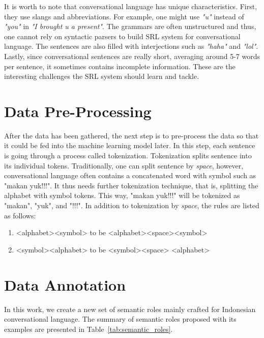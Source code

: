 It is worth to note that conversational language has unique characteristics. First, they use slangs and abbreviations. For example, one might use \textit{"u"} instead of \textit{"you"} in \textit{"I brought u a present"}. The grammars are often unstructured and thus, one cannot rely on syntactic parsers to build SRL system for conversational language. The sentences are also filled with interjections such as \textit{"haha"} and \textit{"lol"}. Lastly, since conversational sentences are really short, averaging around 5-7 words per sentence, it sometimes contains incomplete information. These are the interesting challenges the SRL system should learn and tackle.

\section{Data Pre-Processing}
After the data has been gathered, the next step is to pre-process the data so that it could be fed into the machine learning model later. In this step, each sentence is going through a process called tokenization. Tokenization splits sentence into its individual tokens. Traditionally, one can split sentence by \textit{space}, however, conversational language often contains a concatenated word with symbol such as "makan yuk!!!". It thus needs further tokenization technique, that is, splitting the alphabet with symbol tokens. This way, "makan yuk!!!" will be tokenized as "makan", "yuk", and "!!!". In addition to tokenization by \textit{space}, the rules are listed as follows:
\begin{enumerate}
	\item <alphabet><symbol> to be <alphabet><space><symbol>
	\item <symbol><alphabet> to be <symbol><space> <alphabet>
\end{enumerate}

\section{Data Annotation}
In this work, we create a new set of semantic roles mainly crafted for Indonesian conversational language. The summary of semantic roles proposed with its examples are presented in Table~\ref{tab:semantic_roles}.


